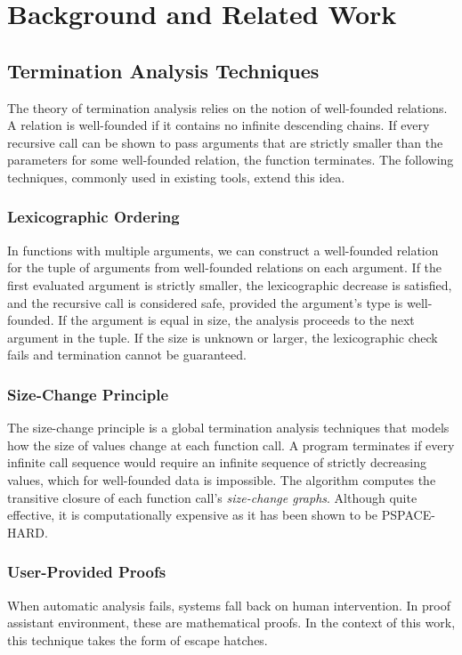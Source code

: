 \chapter{Background and Related Work}

\section{Termination Analysis Techniques}

The theory of termination analysis relies on the notion of well-founded
relations. A relation is well-founded if it contains no infinite descending
chains. If every recursive call can be shown to pass arguments that are strictly
smaller than the parameters for some well-founded relation, the function
terminates.
The following techniques, commonly used in existing tools, extend this idea.

\subsection{Lexicographic Ordering}
In functions with multiple arguments, we can construct a well-founded relation
for the tuple of arguments from well-founded relations on each argument. 
If the first evaluated argument is strictly smaller, the lexicographic decrease
is satisfied, and the recursive call is considered safe, provided the argument's
type is well-founded. If the argument is equal in size, the analysis proceeds to
the next argument in the tuple. If the size is unknown or larger, the
lexicographic check fails and termination cannot be guaranteed.

\subsection{Size-Change Principle}
The size-change principle \cite{SizeChange} is a global termination analysis
techniques that models how the size of values change at each function call.
A program terminates if every infinite call sequence would require an infinite
sequence of strictly decreasing values, which for well-founded data is
impossible. The algorithm computes the transitive closure of each function
call's \emph{size-change graphs}. Although quite effective, it is
computationally expensive as it has been shown to be \textsf{PSPACE-HARD}.

\subsection{User-Provided Proofs}
When automatic analysis fails, systems fall back on human intervention. In proof
assistant environment, these are mathematical proofs. In the context of this
work, this technique takes the form of escape hatches.

